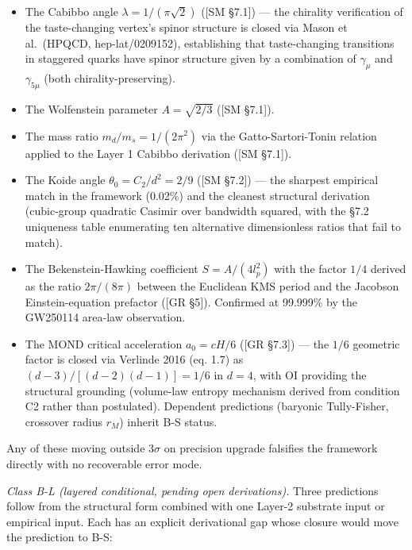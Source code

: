 \documentclass[
]{article}
\providecommand{\tightlist}{%
  \setlength{\itemsep}{0pt}\setlength{\parskip}{0pt}}
\begin{document}
\begin{itemize}
\tightlist
\item
  The Cabibbo angle \(\lambda = 1/(\pi\sqrt{2})\) ({[}SM §7.1{]}) ---
  the chirality verification of the taste-changing vertex's spinor
  structure is closed via Mason et al.~(HPQCD, hep-lat/0209152),
  establishing that taste-changing transitions in staggered quarks have
  spinor structure given by a combination of \(\gamma_\mu\) and
  \(\gamma_{5\mu}\) (both chirality-preserving).
\item
  The Wolfenstein parameter \(A = \sqrt{2/3}\) ({[}SM §7.1{]}).
\item
  The mass ratio \(m_d/m_s = 1/(2\pi^2)\) via the Gatto-Sartori-Tonin
  relation applied to the Layer 1 Cabibbo derivation ({[}SM §7.1{]}).
\item
  The Koide angle \(\theta_0 = C_2/d^2 = 2/9\) ({[}SM §7.2{]}) --- the
  sharpest empirical match in the framework (0.02\%) and the cleanest
  structural derivation (cubic-group quadratic Casimir over bandwidth
  squared, with the §7.2 uniqueness table enumerating ten alternative
  dimensionless ratios that fail to match).
\item
  The Bekenstein-Hawking coefficient \(S = A/(4 l_p^2)\) with the factor
  \(1/4\) derived as the ratio \(2\pi/(8\pi)\) between the Euclidean KMS
  period and the Jacobson Einstein-equation prefactor ({[}GR §5{]}).
  Confirmed at 99.999\% by the GW250114 area-law observation.
\item
  The MOND critical acceleration \(a_0 = cH/6\) ({[}GR §7.3{]}) --- the
  \(1/6\) geometric factor is closed via Verlinde 2016 (eq. 1.7) as
  \((d-3)/[(d-2)(d-1)] = 1/6\) in \(d = 4\), with OI providing the
  structural grounding (volume-law entropy mechanism derived from
  condition C2 rather than postulated). Dependent predictions (baryonic
  Tully-Fisher, crossover radius \(r_M\)) inherit B-S status.
\end{itemize}

Any of these moving outside \(3\sigma\) on precision upgrade falsifies
the framework directly with no recoverable error mode.

\emph{Class B-L (layered conditional, pending open derivations).} Three
predictions follow from the structural form combined with one Layer-2
substrate input or empirical input. Each has an explicit derivational
gap whose closure would move the prediction to B-S:
\end{document}
